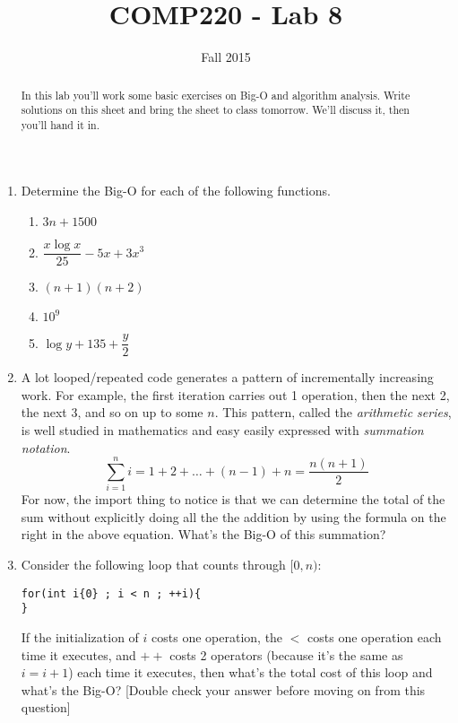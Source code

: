 \documentclass[10pt]{article}
\title{COMP220 - Lab 8}
\author{ }
\date{Fall 2015}
\begin{document}
\maketitle
\thispagestyle{empty}

\begin{abstract}
In this lab you'll work some basic exercises on Big-O and algorithm analysis. Write solutions on this sheet and bring the sheet to class tomorrow. We'll discuss it, then you'll hand it in.
\end{abstract}

\begin{enumerate}
\item Determine the Big-O for each of the following functions.
\begin{enumerate}
\item $3n+1500$
\vspace{.35in}
\item $\dfrac{x\log x}{25} - 5x + 3x^3$
\vspace{.35in}
\item $(n+1)(n+2)$
\vspace{.35in}
\item $10^9$
\vspace{.35in}
\item $\log y + 135 + \dfrac{y}{2}$
\vspace{.35in}
\end{enumerate}
\item A lot looped/repeated code generates a pattern of incrementally increasing work. For example, the first iteration carries out 1 operation, then the next 2, the next 3, and so on up to some $n$. This pattern, called the \textit{arithmetic series}, is well studied in mathematics and easy easily expressed with \textit{summation notation}. 
\[
\sum\limits_{i=1}^{n} i = 1 + 2 + \ldots + (n-1) + n =  \dfrac{n(n+1)}{2}
\]
For now, the import thing to notice is that we can determine the total of the sum without explicitly doing all the the addition by using the formula on the right in the above equation. What's the Big-O of this summation? 
\newpage \thispagestyle{empty}
\item Consider the following loop that counts through $[0,n)$:
\begin{center}
\begin{lstlisting}
for(int i{0} ; i < n ; ++i){ 
}
\end{lstlisting}
\end{center}
If the initialization of $i$ costs one operation, the $<$ costs one operation each time it executes, and $++$ costs 2 operators (because it's the same as $i=i+1$) each time it executes, then what's the total cost of this loop and what's the Big-O? [Double check your answer before moving on from this question]

\end{enumerate}
\end{document}
